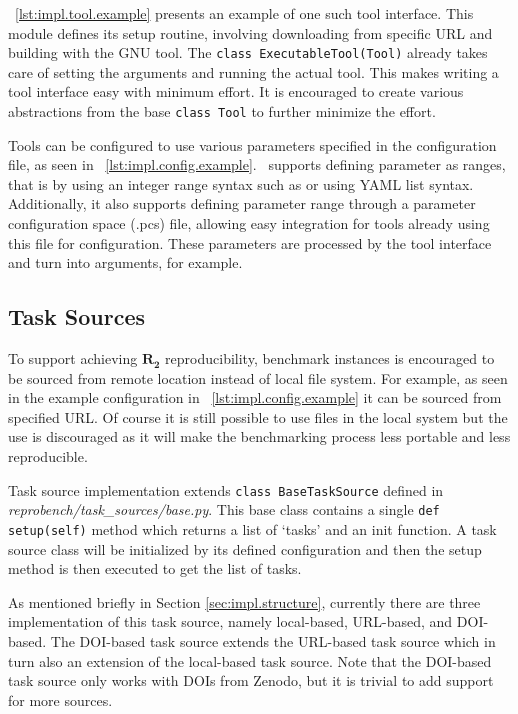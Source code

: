 \lst~\ref{lst:impl.tool.example} presents an example of one such tool interface.
This module defines its setup routine, involving downloading from specific URL and building with the GNU  tool.
The \texttt{class ExecutableTool(Tool)} already takes care of setting the arguments and running the actual tool.
This makes writing a tool interface easy with minimum effort.
It is encouraged to create various abstractions from the base \texttt{class Tool} to further minimize the effort.

Tools can be configured to use various parameters specified in the configuration file, as seen in \lst~\ref{lst:impl.config.example}.
\OurBenchmarkingTool~supports defining parameter as ranges, that is by using an integer range syntax such as  or using YAML list syntax.
Additionally, it also supports defining parameter range through a parameter configuration space (.pcs) file, allowing easy integration for tools already using this file for configuration.
These parameters are processed by the tool interface and turn into arguments, for example.


\subsection{Task Sources}

To support achieving \(\bm{R_2}\) reproducibility, benchmark instances is encouraged to be sourced from remote location instead of local file system.
For example, as seen in the example configuration in \lst~\ref{lst:impl.config.example} it can be sourced from specified URL.
Of course it is still possible to use files in the local system but the use is discouraged as it will make the benchmarking process less portable and less reproducible.

Task source implementation extends \texttt{class BaseTaskSource} defined in \emph{reprobench/task\_sources/base.py}.
This base class contains a single \texttt{def setup(self)} method which returns a list of `tasks' and an init function.
A task source class will be initialized by its defined configuration and then the setup method is then executed to get the list of tasks.

As mentioned briefly in Section \ref{sec:impl.structure}, currently there are three implementation of this task source, namely local-based, URL-based, and DOI-based.
The DOI-based task source extends the URL-based task source which in turn also an extension of the local-based task source.
Note that the DOI-based task source only works with DOIs from Zenodo, but it is trivial to add support for more sources.

